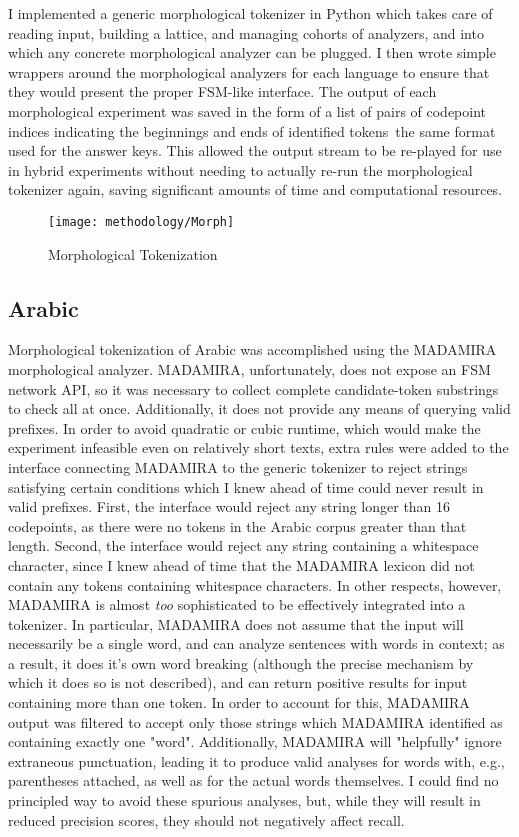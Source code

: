 I implemented a generic morphological tokenizer in Python which takes care of reading input, building a lattice, and managing cohorts of analyzers, and into which any concrete morphological analyzer can be plugged. I then wrote simple wrappers around the morphological analyzers for each language to ensure that they would present the proper FSM-like interface.
The output of each morphological experiment was saved in the form of a list of pairs of codepoint indices indicating the beginnings and ends of identified tokens\textemdash~the same format used for the answer keys. This allowed the output stream to be re-played for use in hybrid experiments without needing to actually re-run the morphological tokenizer again, saving significant amounts of time and computational resources.

\begin{figure}[ht!]
	\texttt{[image: methodology/Morph]}
	\caption{Morphological Tokenization}
	\label{morphdiagram}
\end{figure}

\subsection{Arabic}
Morphological tokenization of Arabic was accomplished using the MADAMIRA morphological analyzer\cite{pasha14}. MADAMIRA, unfortunately, does not expose an FSM network API, so it was necessary to collect complete candidate-token substrings to check all at once. Additionally, it does not provide any means of querying valid prefixes. In order to avoid quadratic or cubic runtime, which would make the experiment infeasible even on relatively short texts, extra rules were added to the interface connecting MADAMIRA to the generic tokenizer to reject strings satisfying certain conditions which I knew ahead of time could never result in valid prefixes. First, the interface would reject any string longer than 16 codepoints, as there were no tokens in the Arabic corpus greater than that length. Second, the interface would reject any string containing a whitespace character, since I knew ahead of time that the MADAMIRA lexicon did not contain any tokens containing whitespace characters.
In other respects, however, MADAMIRA is almost \textit{too} sophisticated to be effectively integrated into a tokenizer. In particular, MADAMIRA does not assume that the input will necessarily be a single word, and can analyze sentences with words in context; as a result, it does it's own word breaking (although the precise mechanism by which it does so is not described), and can return positive results for input containing more than one token. In order to account for this, MADAMIRA output was filtered to accept only those strings which MADAMIRA identified as containing exactly one "word". Additionally, MADAMIRA will "helpfully" ignore extraneous punctuation, leading it to produce valid analyses for words with, e.g., parentheses attached, as well as for the actual words themselves. I could find no principled way to avoid these spurious analyses, but, while they will result in reduced precision scores, they should not negatively affect recall.

